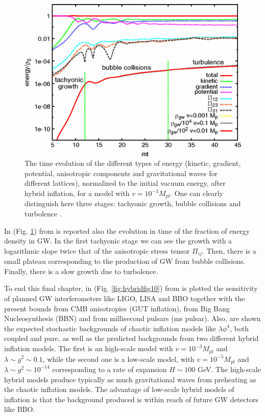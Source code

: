 \documentclass[11pt,a4paper,twoside]{book}
\begin{document}
\begin{figure}
	\centering
	\includegraphics[width=0.65\linewidth, height=0.35\textheight]{Images/Chap7/Hybrid_Fig2}
	\caption{The time evolution of the different types of energy (kinetic, gradient, potential, anisotropic components and gravitational waves for different lattices), normalized to the initial vacuum energy, after hybrid inflation, for a model with $ v=10^{-3} M_{pl} $. One can clearly distinguish here three stages: tachyonic growth, bubble collisions and turbolence \cite{Chap7:HybridModel}. }
	\label{fig:hybridfig2}
\end{figure}


In (Fig. \ref{fig:hybridfig2})  from \cite{Chap7:HybridModel} is reported also the evolution in time of the fraction of energy density in GW. In the first tachyonic stage we can see the growth with a logarithmic slope twice that of the anisotropic stress tensor $ \Pi_{ij} $. Then, there is a small plateau corresponding to the production of GW from bubble collisions. Finally, there is a slow growth due to turbolence. 

To end this final chapter, in (Fig. \ref{fig:hybridfig10}) from \cite{Chap7:HybridModel} is plotted the sensitivity of planned GW interferometers like LIGO, LISA and BBO together with the present bounds from CMB anisotropies (GUT inflation), from Big Bang Nucleosynthesis (BBN) and from millisecond pulsars (ms pulsar). Also, are shown the expected stochastic backgrounds of chaotic inflation models like $\lambda\phi^{4}$, both coupled and pure, as well as the predicted backgrounds from two different hybrid inflation models. The first is an high-scale model  with $ v=10^{-3} M_{pl} $ and $ \lambda \sim g^{2} \sim 0.1 $, while the second one is a low-scale model, with $ v=10^{-5} M_{pl} $ and $ \lambda \sim g^{2} \sim 10^{-14} $ corresponding to a rate of expansion $ H \sim 100 $ GeV. The high-scale hybrid models produce typically as much gravitational waves from preheating as the chaotic inflation models. The advantage of low-scale hybrid models of inflation is that the background produced is within reach of future GW detectors like BBO.
\end{document}
